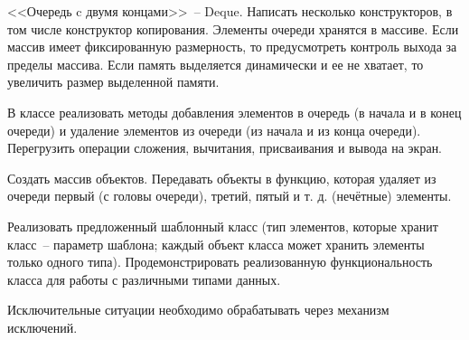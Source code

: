 
<<Очередь c двумя концами>>~-- Deque. Написать несколько конструкторов, в том числе
конструктор копирования. Элементы очереди хранятся в массиве. Если массив имеет
фиксированную размерность, то предусмотреть контроль выхода за пределы массива. Если
память выделяется динамически и ее не хватает, то увеличить размер выделенной памяти.

В классе реализовать методы добавления элементов в очередь (в начала и в конец очереди)
и удаление элементов из очереди (из начала и из конца очереди). Перегрузить операции
сложения, вычитания, присваивания и вывода на экран.

Создать массив объектов.
Передавать объекты в функцию, которая удаляет из очереди первый (с головы очереди),
третий, пятый и т. д. (нечётные) элементы.

Реализовать предложенный шаблонный класс (тип элементов, которые
хранит класс~-- параметр шаблона; каждый объект класса может хранить
элементы только одного типа). Продемонстрировать реализованную
функциональность класса для работы с различными типами данных.

Исключительные ситуации необходимо обрабатывать через механизм исключений.
